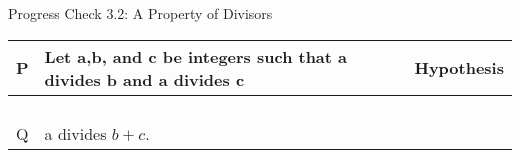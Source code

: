 \documentclass{beamer}
\begin{document}
\begin{frame}{Progress Check 3.2: A Property of Divisors}
	\begin{tabular}{|l|p{2.5 in}|p{1.5 in}|}
		\hline
		P & Let a,b, and c be integers such that a divides b and a divides c & Hypothesis\\ \hline
		&&\\\hline
		&&\\\hline
		&&\\\hline
		&&\\\hline
		Q & a divides $b+c$. & \\ \hline
	\end{tabular}
\end{frame}
\end{document}
